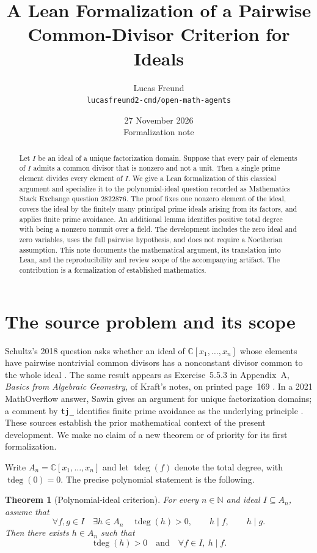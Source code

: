 \documentclass[11pt]{article}
\title{A Lean Formalization of a Pairwise\newline
Common-Divisor Criterion for Ideals}
\author{Lucas Freund\\[2pt]
  \small\texttt{lucasfreund2-cmd/open-math-agents}}
\date{27 November 2026\\[2pt]\small Formalization note}
\newtheorem{theorem}{Theorem}[section]
\theoremstyle{remark}
\newcommand{\C}{\mathbb{C}}
\newcommand{\N}{\mathbb{N}}
\newcommand{\td}{\operatorname{tdeg}}
\begin{document}
\maketitle

\begin{abstract}
Let $I$ be an ideal of a unique factorization domain. Suppose that every
pair of elements of $I$ admits a common divisor that is nonzero and not a
unit. Then a single prime element divides every element of $I$.
We give a Lean formalization of this classical argument and specialize
it to the polynomial-ideal question recorded as Mathematics Stack
Exchange question 2822876. The proof fixes one nonzero element of the
ideal, covers the ideal by the finitely many principal prime ideals
arising from its factors, and applies finite prime avoidance. An
additional lemma identifies positive total degree with being a nonzero
nonunit over a field. The development includes the zero ideal and zero
variables, uses the full pairwise hypothesis, and does not require a
Noetherian assumption. This note documents the mathematical argument,
its translation into Lean, and the reproducibility and review scope of
the accompanying artifact. The contribution is a formalization of
established mathematics.
\end{abstract}

\section{The source problem and its scope}

Schultz's 2018 question asks whether an ideal of
$\C[x_1,\ldots,x_n]$ whose elements have pairwise nontrivial common
divisors has a nonconstant divisor common to the whole ideal
\cite{schultz}. The same result appears as Exercise~5.5.3 in Appendix~A,
\emph{Basics from Algebraic Geometry}, of Kraft's notes, on printed
page~169 \cite{kraft}. In a 2021 MathOverflow answer, Sawin gives an
argument for unique factorization domains; a comment by \texttt{tj\_}
identifies finite prime avoidance as the underlying principle
\cite{sawin,tj}. These sources establish the prior mathematical context
of the present development. We make no claim of a new theorem or of
priority for its first formalization.

Write $A_n=\C[x_1,\ldots,x_n]$ and let $\td(f)$ denote the total degree,
with $\td(0)=0$. The precise polynomial statement is the following.

\begin{theorem}[Polynomial-ideal criterion]\label{thm:polynomial}
For every $n\in\N$ and ideal $I\subseteq A_n$, assume that
\begin{equation}\label{eq:polynomial-pair}
  \forall f,g\in I\quad
  \exists h\in A_n\quad
  \td(h)>0,\qquad h\mid f,\qquad h\mid g.
\end{equation}
Then there exists $h\in A_n$ such that
\begin{equation}\label{eq:polynomial-global}
  \td(h)>0
  \quad\text{and}\quad
  \forall f\in I,\ h\mid f.
\end{equation}
\end{theorem}
\end{document}
